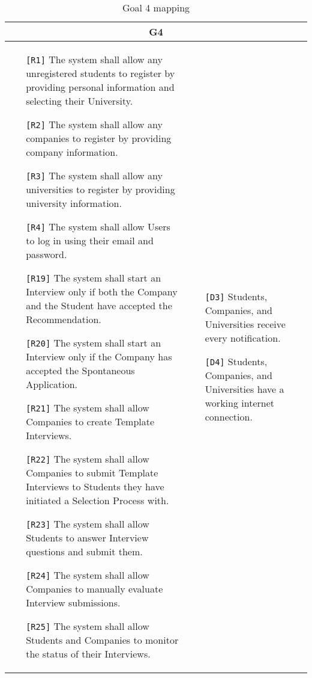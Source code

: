 \begin{table}[H]
 \centering
 \begin{tabular}{|p{8cm}|p{8cm}|}
  \hline
  \multicolumn{2}{|c|}{G4} \\
  \hline
  \begin{itemize}
   \item[\texttt{[R1]}] The system shall allow any unregistered students to register by providing personal information and selecting their University.
   \item[\texttt{[R2]}] The system shall allow any companies to register by providing company information.
   \item[\texttt{[R3]}] The system shall allow any universities to register by providing university information.
   \item[\texttt{[R4]}] The system shall allow Users to log in using their email and password.
   \item[\texttt{[R19]}] The system shall start an Interview only if both the Company and the Student have accepted the Recommendation.
   \item[\texttt{[R20]}] The system shall start an Interview only if the Company has accepted the Spontaneous Application.
   \item[\texttt{[R21]}] The system shall allow Companies to create Template Interviews.
   \item[\texttt{[R22]}] The system shall allow Companies to submit Template Interviews to Students they have initiated a Selection Process with.
   \item[\texttt{[R23]}] The system shall allow Students to answer Interview questions and submit them.
   \item[\texttt{[R24]}] The system shall allow Companies to manually evaluate Interview submissions.
   \item[\texttt{[R25]}] The system shall allow Students and Companies to monitor the status of their Interviews.
  \end{itemize} &
  \begin{itemize}
   \item[\texttt{[D3]}] Students, Companies, and Universities receive every notification.
   \item[\texttt{[D4]}] Students, Companies, and Universities have a working internet connection.
  \end{itemize} \\ \hline
 \end{tabular}
 \caption{Goal 4 mapping}
 \label{tab:G4}
\end{table}

